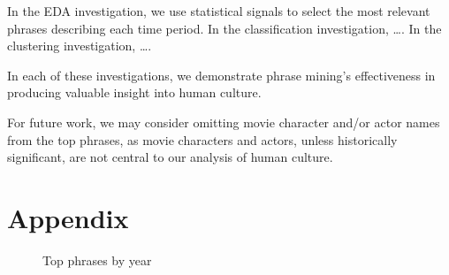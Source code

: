 \documentclass{article}
\begin{document}
\begin{multicols}{2}
In the EDA investigation, we use statistical signals to select the most relevant phrases describing each time period. In the classification investigation, \ldots. In the clustering investigation, \ldots.

In each of these investigations, we demonstrate phrase mining's effectiveness in producing valuable insight into human culture.

For future work, we may consider omitting movie character and/or actor names from the top phrases, as movie characters and actors, unless historically significant, are not central to our analysis of human culture.

\nocite{10.1145/2723372.2751523}


\section{Appendix} \label{appendix} %
\begin{figure}
\caption{Top phrases by year}
\centering
{}
\label{figure:top_phrases_by_year}
\end{figure}

\begin{figure}
\ContinuedFloat
\centering
{}
\end{figure}
\end{multicols}
\end{document}
